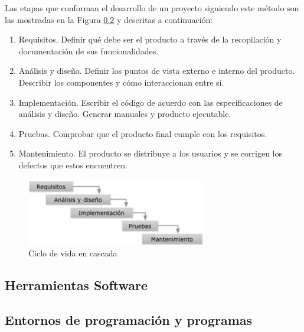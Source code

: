 Las etapas que conforman el desarrollo de un proyecto siguiendo este método son las mostradas en la Figura \ref{} y descritas \cite{pradel2013ingenieria} a continuación:
\begin{enumerate}
    \item Requisitos. Definir qué debe ser el producto a través de la recopilación y documentación de sus funcionalidades.
    \item Análisis y diseño. Definir los puntos de vista externo e interno del producto. Describir los componentes y cómo interaccionan entre sí.
    \item Implementación. Escribir el código de acuerdo con las especificaciones de análisis y diseño. Generar manuales y producto ejecutable.
    \item Pruebas. Comprobar que el producto final cumple con los requisitos.
    \item Mantenimiento. El producto se distribuye a los usuarios y se corrigen los defectos que estos encuentren.
\end{enumerate}

\begin{figure}[h]
    \centering
    \includegraphics[width=0.7\textwidth]{img/4.TecnicasHerramientas/Cascada.png}
    \caption{Ciclo de vida en cascada \cite{pradel2013ingenieria}}
    \label{fig:cicloCascada}
\end{figure}


\subsection{Herramientas Software}



\subsection{Entornos de programación y programas}

